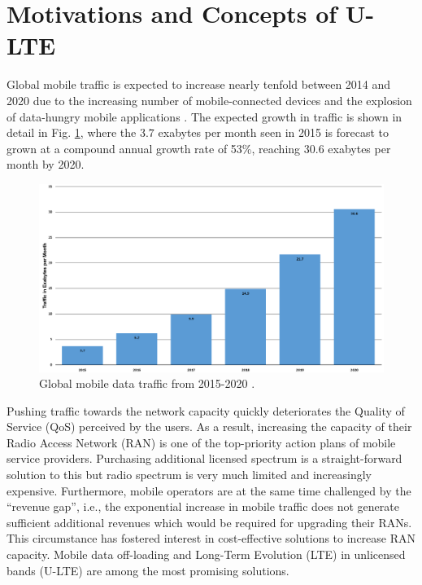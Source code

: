 \section{Motivations and Concepts of U-LTE}
\label{lte-motiv}

Global mobile traffic is expected to increase nearly tenfold between 2014 and 2020 due to the increasing number of mobile-connected devices and the explosion of data-hungry mobile applications \cite{cisco_mobile_traffic_2015}. The expected growth in traffic is shown in detail in Fig. \ref{figs:global-mobile-data-traffic-2015-2020}, where the $3.7$ exabytes per month seen in 2015 is forecast to grown at a compound annual growth rate of 53\%, reaching $30.6$ exabytes per month by 2020. 
\begin{figure}[!ht]
	\centering
	\includegraphics[width=\textwidth]{figs/global-mobile-data-traffic-2015-2020}
	\caption{Global mobile data traffic from 2015-2020 \cite{cisco_mobile_traffic_2015}.}
	\label{figs:global-mobile-data-traffic-2015-2020}
\end{figure}
Pushing traffic towards the network capacity quickly deteriorates the Quality of Service (QoS) perceived by the users. As a result, increasing the capacity of their Radio Access Network (RAN) is one of the top-priority action plans of mobile service providers. Purchasing additional licensed spectrum is a straight-forward solution to this but radio spectrum is very much limited and increasingly expensive. Furthermore, mobile operators are at the same time challenged by the ``revenue gap'', i.e., the exponential increase in mobile traffic does not generate sufficient additional revenues which would be required for upgrading their RANs. This circumstance has fostered interest in cost-effective solutions to increase RAN capacity. Mobile data off-loading and Long-Term Evolution (LTE) in unlicensed bands (U-LTE) are among the most promising solutions.

